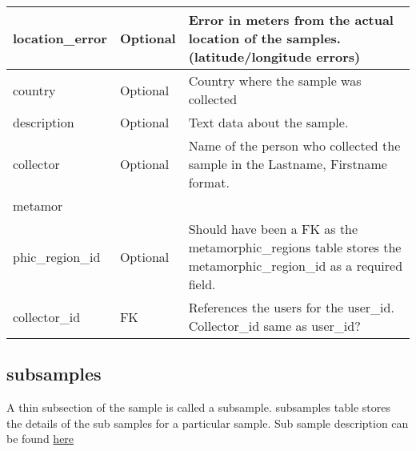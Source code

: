 \documentclass[letterpaper,10pt,english]{sphinxmanual}
\begin{document}
\begin{tabulary}{\linewidth}{|L|L|L|}
location\_error
 & 
Optional
 & 
Error in meters from the actual location of the samples.
(latitude/longitude errors)
\\\hline

country
 & 
Optional
 & 
Country where the sample was collected
\\\hline

description
 & 
Optional
 & 
Text data about the sample.
\\\hline

collector
 & 
Optional
 & 
Name of the person who collected the sample in the Lastname, Firstname format.
\\\hline

metamor
 &  & \\\hline

phic\_region\_id
 & 
Optional
 & 
Should have been a FK as the metamorphic\_regions table stores the
metamorphic\_region\_id as a required field.
\\\hline

collector\_id
 & 
FK
 & 
References the users for the user\_id. Collector\_id same as user\_id?
\\\hline
\end{tabulary}



\subsection{subsamples}
\label{Table_Description:subsamples}
A thin subsection of the sample is called a subsample. subsamples table stores the details of the sub samples for a particular sample. Sub sample description can be found \href{http://wiki.cs.rpi.edu/trac/metpetdb/wiki/Subsample}{here}
\end{document}
